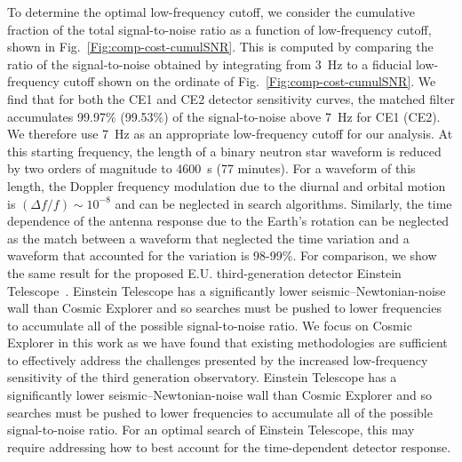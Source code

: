 To determine the optimal low-frequency cutoff, we consider the cumulative fraction of the total signal-to-noise ratio as a function of low-frequency cutoff, shown in Fig.~\ref{Fig:comp-cost-cumulSNR}. This is computed by comparing the ratio of the signal-to-noise obtained by integrating from $3$~Hz to a fiducial low-frequency cutoff shown on the ordinate of Fig.~\ref{Fig:comp-cost-cumulSNR}.
We find that for both the CE1 and CE2 detector sensitivity curves, the matched filter accumulates 99.97\% (99.53\%) of the signal-to-noise above 7~Hz for CE1 (CE2). We therefore use 7~Hz as an appropriate low-frequency cutoff for our analysis. At this starting frequency, the length of a binary neutron star waveform is reduced by two orders of magnitude to $4600$~s (77 minutes). For a
waveform of this length, the Doppler frequency modulation due to the diurnal
and orbital motion is $(\Delta f / f ) \sim 10^{-8}$ and can be neglected in
search algorithms. Similarly, the time dependence of the antenna response due to the Earth's rotation can be neglected as the match between a waveform that neglected the time variation and a waveform that accounted for the variation is 98-99\%. For comparison, we show the same result for the proposed E.U. third-generation detector Einstein Telescope~\cite{Maggiore:2019uih}. Einstein Telescope has a significantly lower seismic--Newtonian-noise wall than Cosmic Explorer and so searches must be pushed to lower frequencies to accumulate all of the possible signal-to-noise ratio. We focus on Cosmic Explorer in this work as we have found that existing methodologies are sufficient to effectively address the challenges presented by the increased low-frequency sensitivity of the third generation observatory.  Einstein Telescope has a significantly lower seismic--Newtonian-noise wall than Cosmic Explorer and so searches must be pushed to lower frequencies to accumulate all of the possible signal-to-noise ratio. For an optimal search of Einstein Telescope, this may require addressing how to best account for the time-dependent detector response. 
